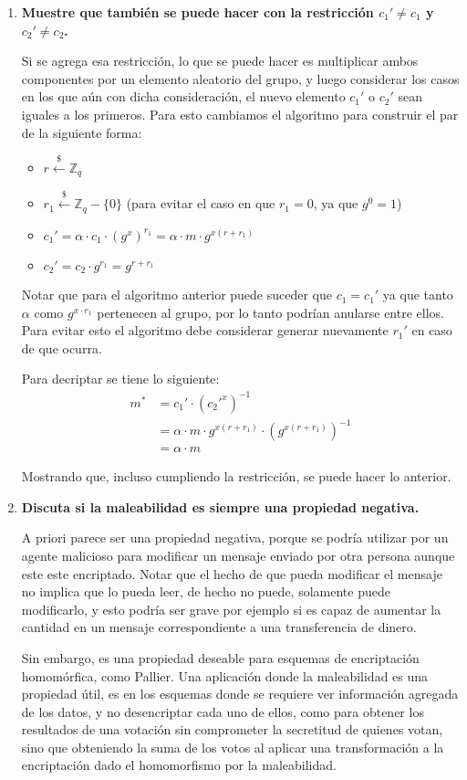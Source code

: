 \documentclass[twoside]{tareas}
\newcommand{\getunif}{\stackrel{\$}{\gets}}
\begin{document}
\begin{enumerate}
    \item \textbf{Muestre que también se puede hacer con la restricción {\boldmath$c_1' \neq c_1$} y {\boldmath$c_2'\neq c_2$}.}

    Si se agrega esa restricción, lo que se puede hacer es multiplicar ambos componentes por un elemento aleatorio del grupo, y luego considerar los casos en los que aún con dicha consideración, el nuevo elemento $c_1'$ o $c_2'$ sean iguales a los primeros. Para esto cambiamos el algoritmo para construir el par de la siguiente forma:
     \begin{itemize}
        \item $r \getunif \mathbb{Z}_q$
        \item $r_1 \getunif \mathbb{Z}_q - \{0\}$ (para evitar el caso en que $r_1 = 0$, ya que $g^0 = 1$)
        \item $c_1' = \alpha \cdot c_1 \cdot (g^x)^{r_1} = \alpha \cdot m \cdot g^{x(r + r_1)}$
        \item $c_2' = c_2 \cdot g^{r_1}= g^{r+r_1}$
    \end{itemize}

    Notar que para el algoritmo anterior puede suceder que $c_1 = c_1'$ ya que tanto $\alpha$ como $g^{x \cdot r_1}$ pertenecen al grupo, por lo tanto podrían anularse entre ellos. Para evitar esto el algoritmo debe considerar generar nuevamente $r_1'$ en caso de que ocurra.

    Para decriptar se tiene lo siguiente:
    \begin{align*}
        m^* &= c_1' \cdot (c_2'^x)^{-1}\\
        &= \alpha \cdot m \cdot g^{x(r + r_1)} \cdot (g^{x(r + r_1)})^{-1}\\
        &= \alpha \cdot m
    \end{align*}

    Mostrando que, incluso cumpliendo la restricción, se puede hacer lo anterior.

    \item \textbf{Discuta si la maleabilidad es siempre una propiedad negativa.}

    A priori parece ser una propiedad negativa, porque se podría utilizar por un agente malicioso para modificar un mensaje enviado por otra persona aunque este este encriptado. Notar que el hecho de que pueda modificar el mensaje no implica que lo pueda leer, de hecho no puede, solamente puede modificarlo, y esto podría ser grave por ejemplo si es capaz de aumentar la cantidad en un mensaje correspondiente a una transferencia de dinero.

    Sin embargo, es una propiedad deseable para esquemas de encriptación homomórfica, como Pallier. Una aplicación donde la maleabilidad es una propiedad útil, es en los esquemas donde se requiere ver información agregada de los datos, y no desencriptar cada uno de ellos, como para obtener los resultados de una votación sin comprometer la secretitud de quienes votan, sino que obteniendo la suma de los votos al aplicar una transformación a la encriptación dado el homomorfismo por la maleabilidad.

\end{enumerate}
\end{document}
